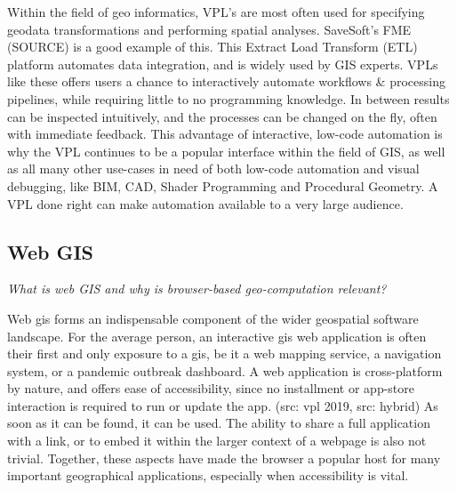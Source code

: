 Within the field of geo informatics, VPL's are most often used for specifying geodata transformations and performing spatial analyses.  
SaveSoft's FME (SOURCE) is a good example of this. This Extract Load Transform (ETL) platform automates data integration, and is widely used by GIS experts. 
VPLs like these offers users a chance to interactively automate workflows \& processing pipelines, while requiring little to no programming knowledge. 
In between results can be inspected intuitively, and the processes can be changed on the fly, often with immediate feedback.
This advantage of interactive, low-code automation is why the VPL continues to be a popular interface within the field of GIS, as well as all many other use-cases in need of both low-code automation and visual debugging, like BIM, CAD, Shader Programming and Procedural Geometry. 
A VPL done right can make automation available to a very large audience. 



\subsection*{Web GIS}

\emph{What is web GIS and why is browser-based geo-computation relevant?}

Web \ac{gis} forms an indispensable component of the wider geospatial software landscape. 
For the average person, an interactive \ac{gis} web application is often their first and only exposure to a \acs{gis}, be it a web mapping service, a navigation system, or a pandemic outbreak dashboard. 
A web application is cross-platform by nature, and offers ease of accessibility, since no installment or app-store interaction is required to run or update the app. (src: vpl 2019, src: hybrid)
As soon as it can be found, it can be used.
The ability to share a full application with a link, or to embed it within the larger context of a webpage is also not trivial. 
Together, these aspects have made the browser a popular host for many important geographical applications, especially when accessibility is vital.

